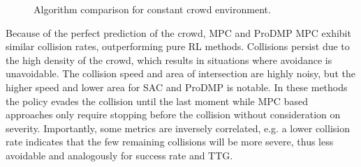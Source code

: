 \documentclass[letterpaper,conference,10pt]{IEEEconf}
\begin{document}
\begin{figure}
    \centering
    \scalebox{1.34}{}
    \vspace{-10mm}
    \caption{Algorithm comparison for constant crowd environment.}
    \vspace{-5mm}
    \label{plots:const}
\end{figure}

Because of the perfect prediction of the crowd, MPC and ProDMP MPC exhibit similar collision rates, outperforming pure RL methods. Collisions persist due to the high density of the crowd, which results in situations where avoidance is unavoidable. The collision speed and area of intersection are highly noisy, but the higher speed and lower area for SAC and ProDMP is notable. In these methods the policy evades the collision until the last moment while MPC based approaches only require stopping before the collision without consideration on severity. Importantly, some metrics are inversely correlated, e.g. a lower collision rate indicates that the few remaining collisions will be more severe, thus less avoidable and analogously for success rate and TTG.
\end{document}
